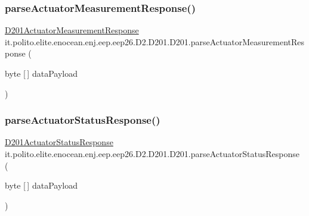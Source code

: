 \hypertarget{classit_1_1polito_1_1elite_1_1enocean_1_1enj_1_1eep_1_1eep26_1_1_d2_1_1_d201_1_1_d201_a3667af356bcce85d053e430ecdc94241}{}\label{classit_1_1polito_1_1elite_1_1enocean_1_1enj_1_1eep_1_1eep26_1_1_d2_1_1_d201_1_1_d201_a3667af356bcce85d053e430ecdc94241} 
\subsubsection{\texorpdfstring{parse\+Actuator\+Measurement\+Response()}{parseActuatorMeasurementResponse()}}
{\footnotesize\ttfamily \hyperlink{classit_1_1polito_1_1elite_1_1enocean_1_1enj_1_1eep_1_1eep26_1_1_d2_1_1_d201_1_1_d201_actuator_measurement_response}{D201\+Actuator\+Measurement\+Response} it.\+polito.\+elite.\+enocean.\+enj.\+eep.\+eep26.\+D2.\+D201.\+D201.\+parse\+Actuator\+Measurement\+Response (\begin{DoxyParamCaption}\item[{byte \mbox{[}$\,$\mbox{]}}]{data\+Payload }\end{DoxyParamCaption})}

\hypertarget{classit_1_1polito_1_1elite_1_1enocean_1_1enj_1_1eep_1_1eep26_1_1_d2_1_1_d201_1_1_d201_af4395903eff55ec22792cb1d7ed677fd}{}\label{classit_1_1polito_1_1elite_1_1enocean_1_1enj_1_1eep_1_1eep26_1_1_d2_1_1_d201_1_1_d201_af4395903eff55ec22792cb1d7ed677fd} 
\subsubsection{\texorpdfstring{parse\+Actuator\+Status\+Response()}{parseActuatorStatusResponse()}}
{\footnotesize\ttfamily \hyperlink{classit_1_1polito_1_1elite_1_1enocean_1_1enj_1_1eep_1_1eep26_1_1_d2_1_1_d201_1_1_d201_actuator_status_response}{D201\+Actuator\+Status\+Response} it.\+polito.\+elite.\+enocean.\+enj.\+eep.\+eep26.\+D2.\+D201.\+D201.\+parse\+Actuator\+Status\+Response (\begin{DoxyParamCaption}\item[{byte \mbox{[}$\,$\mbox{]}}]{data\+Payload }\end{DoxyParamCaption})}

